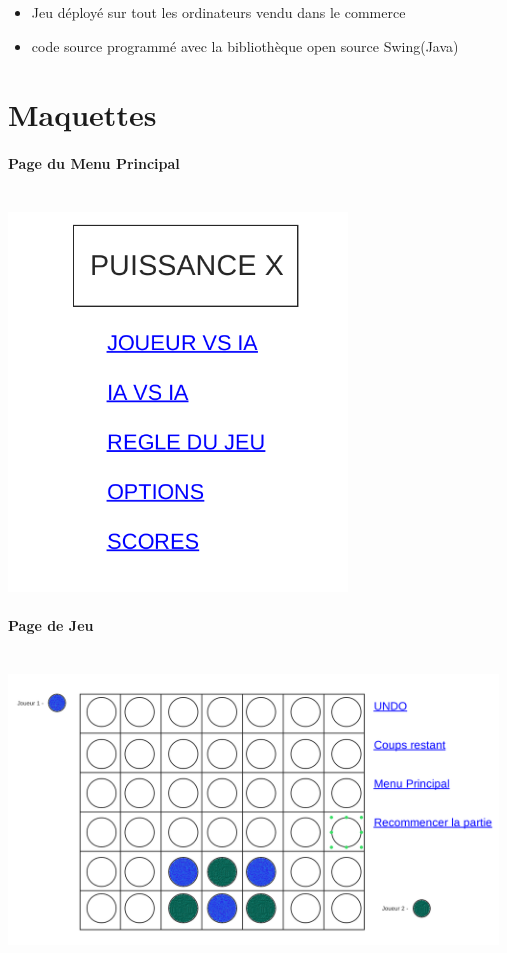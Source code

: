 \documentclass[a4paper,oneside]{article}
\begin{document}
\begin{itemize}
    \item Jeu déployé sur tout les ordinateurs vendu dans le commerce
    \item code source programmé avec la bibliothèque open source Swing(Java)
\end{itemize}







\section{Maquettes}

\paragraph{Page du Menu Principal}

~\\

\includegraphics[width=9cm]{image2.png}

\paragraph{Page de Jeu}

~\\

\includegraphics[width=13cm]{image1.png}



\label{fin}
\end{document}
